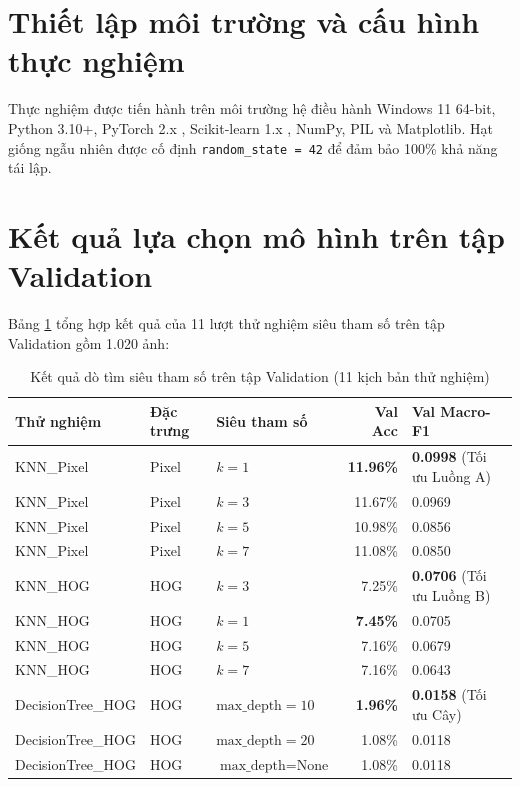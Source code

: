 \documentclass[../DoAn.tex]{subfiles}
\begin{document}
\section{Thiết lập môi trường và cấu hình thực nghiệm}
Thực nghiệm được tiến hành trên môi trường hệ điều hành Windows 11 64-bit, Python 3.10+, PyTorch 2.x \cite{paszke2019pytorch}, Scikit-learn 1.x \cite{scikit-learn}, NumPy, PIL và Matplotlib.
Hạt giống ngẫu nhiên được cố định \texttt{random\_state = 42} để đảm bảo 100\% khả năng tái lập.

\section{Kết quả lựa chọn mô hình trên tập Validation}
Bảng \ref{tab:val_results} tổng hợp kết quả của 11 lượt thử nghiệm siêu tham số trên tập Validation gồm 1.020 ảnh:

\begin{table}[H]
\centering
\small
\caption{Kết quả dò tìm siêu tham số trên tập Validation (11 kịch bản thử nghiệm)}
\label{tab:val_results}
\begin{tabular}{@{}p{3.2cm} p{1.6cm} p{2.4cm} r p{3.6cm}@{}}
\hline
\textbf{Thử nghiệm} & \textbf{Đặc trưng} & \textbf{Siêu tham số} & \textbf{Val Acc} & \textbf{Val Macro-F1} \\ \hline
KNN\_Pixel & Pixel & $k = 1$ & \textbf{11.96\%} & \textbf{0.0998} (Tối ưu Luồng A) \\
KNN\_Pixel & Pixel & $k = 3$ & 11.67\% & 0.0969 \\
KNN\_Pixel & Pixel & $k = 5$ & 10.98\% & 0.0856 \\
KNN\_Pixel & Pixel & $k = 7$ & 11.08\% & 0.0850 \\ \hline
KNN\_HOG & HOG & $k = 3$ & 7.25\% & \textbf{0.0706} (Tối ưu Luồng B) \\
KNN\_HOG & HOG & $k = 1$ & \textbf{7.45\%} & 0.0705 \\
KNN\_HOG & HOG & $k = 5$ & 7.16\% & 0.0679 \\
KNN\_HOG & HOG & $k = 7$ & 7.16\% & 0.0643 \\ \hline
DecisionTree\_HOG & HOG & $\text{max\_depth} = 10$ & \textbf{1.96\%} & \textbf{0.0158} (Tối ưu Cây) \\
DecisionTree\_HOG & HOG & $\text{max\_depth} = 20$ & 1.08\% & 0.0118 \\
DecisionTree\_HOG & HOG & $\text{max\_depth} = \text{None}$ & 1.08\% & 0.0118 \\ \hline
\end{tabular}
\end{table}
\end{document}
